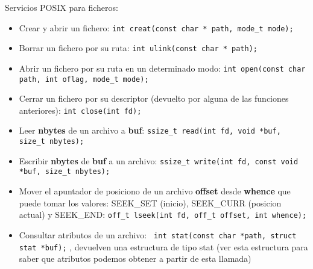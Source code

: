 \documentclass[12pt, letterpaper]{article}
\begin{document}
Servicios POSIX para ficheros:
\begin{itemize}
	\item Crear y abrir un fichero: \texttt{int creat(const char * path, mode\_t mode);}
	\item Borrar un fichero por su ruta: \texttt{int ulink(const char * path);}
	\item Abrir un fichero por su ruta en un determinado modo: \texttt{int open(const char path, int oflag, mode\_t mode);}
	\item Cerrar un fichero por su descriptor (devuelto por alguna de las funciones anteriores): \texttt{int close(int fd);}
	\item Leer \textbf{nbytes} de un archivo a \textbf{buf}: \texttt{ssize\_t read(int fd, void *buf, size\_t nbytes);}
	\item Escribir \textbf{nbytes} de \textbf{buf} a un archivo: \texttt{ssize\_t write(int fd, const void *buf, size\_t nbytes);}
	\item Mover el apuntador de posiciono de un archivo \textbf{offset} desde \textbf{whence} que puede tomar los valores: SEEK\_SET (inicio), SEEK\_CURR (posicion actual) y SEEK\_END: \texttt{off\_t lseek(int fd, off\_t offset, int whence);}
	\item Consultar atributos de un archivo: \texttt{ int stat(const char *path, struct stat *buf);} , devuelven una estructura de tipo stat (ver esta estructura para saber que atributos podemos obtener a partir de esta llamada)
\end{itemize}
\end{document}
